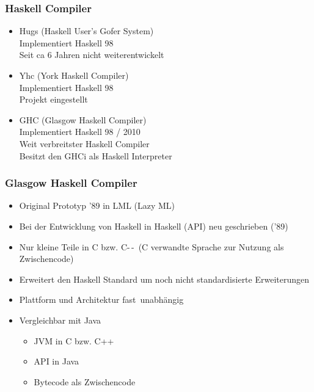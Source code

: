 \documentclass[fleqn,11pt,aspectratio=43]{beamer}
\begin{document}
\begin{frame}
\frametitle{Haskell Compiler}
\begin{block}{\vspace*{-2ex}}
\begin{itemize}
  \item Hugs (Haskell User's Gofer System) \\ Implementiert Haskell 98 \\ Seit ca 6 Jahren nicht weiterentwickelt
  \item Yhc (York Haskell Compiler) \\ Implementiert Haskell 98 \\ Projekt eingestellt
  \item GHC (Glasgow Haskell Compiler) \\ Implementiert Haskell 98 / 2010 \\ Weit verbreitster Haskell Compiler \\ 
  Besitzt den GHCi als Haskell Interpreter
\end{itemize}
\end{block}
\end{frame}

\begin{frame}
\frametitle{Glasgow Haskell Compiler}
\begin{block}{\vspace*{-2ex}}
\begin{itemize}
  \item Original Prototyp '89 in LML (Lazy ML) 
  \item Bei der Entwicklung von Haskell in Haskell (API) neu geschrieben ('89)
  \item Nur kleine Teile in C bzw. C-\,-\  (C verwandte Sprache zur Nutzung als Zwischencode)
  \item Erweitert den Haskell Standard um noch nicht standardisierte Erweiterungen
  \item Plattform und Architektur \glqq fast\grqq\ unabhängig
  \item Vergleichbar mit Java
  \begin{itemize}
  	\item JVM in C bzw. C++
  	\item API in Java
  	\item Bytecode als Zwischencode
  \end{itemize}
\end{itemize}
\end{block}
\end{frame}
\end{document}
